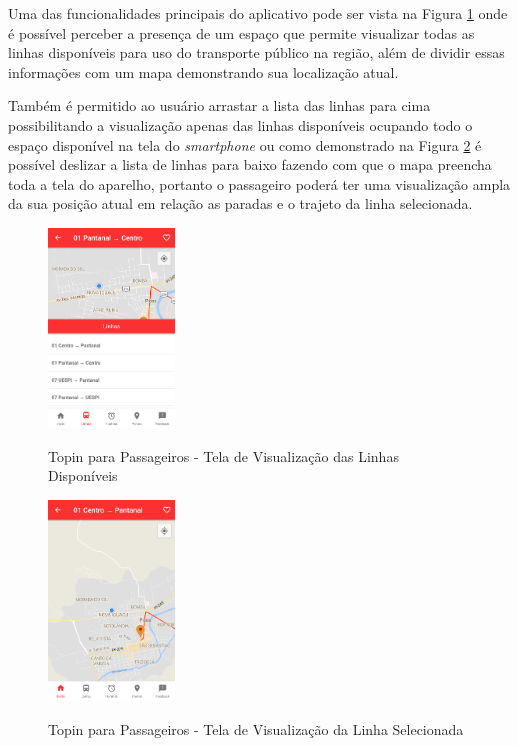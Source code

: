 {{{{{{{Uma das funcionalidades principais do aplicativo pode ser vista na Figura \ref{fig:passageiro-linhas-disponiveis} onde é possível
perceber a presença de um espaço que permite visualizar todas as linhas disponíveis para uso do transporte público na região,
além de dividir essas informações com um mapa demonstrando sua localização atual.

Também é permitido ao usuário arrastar a lista das linhas para cima possibilitando a visualização apenas das linhas disponíveis
ocupando todo o espaço disponível na tela do \textit{smartphone} ou como demonstrado na Figura \ref{fig:passageiro-visualizacao-linha}
é possível deslizar a lista de linhas para baixo fazendo com que o mapa preencha toda a tela do aparelho, portanto o passageiro poderá
ter uma visualização ampla da sua posição atual em relação as paradas e o trajeto da linha selecionada.

\begin{figure}[H]
\caption{Topin para Passageiros - Tela de Visualização das Linhas Disponíveis}
\centering
\includegraphics[width=0.3\textwidth]{imagens/linhas-disponiveis.png}
\label{fig:passageiro-linhas-disponiveis}
\end{figure}

\begin{figure}[H]
\caption{Topin para Passageiros - Tela de Visualização da Linha Selecionada}
\centering
\includegraphics[width=0.3\textwidth]{imagens/visualizacao-linha.png}
\label{fig:passageiro-visualizacao-linha}
\end{figure}

}}}}}}}
